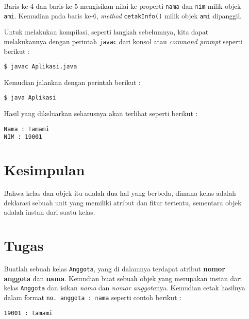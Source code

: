 Baris ke-4 dan baris ke-5 mengisikan nilai ke properti \texttt{nama} dan \texttt{nim} milik objek \texttt{ami}. Kemudian pada baris ke-6, \textit{method} \texttt{cetakInfo()} milik objek \texttt{ami} dipanggil.

Untuk melakukan kompilasi, seperti langkah sebelumnya, kita dapat melakukannya dengan perintah \texttt{javac} dari konsol atau \textit{command prompt} seperti berikut :

\begin{lstlisting}
$ javac Aplikasi.java
\end{lstlisting}

Kemudian jalankan dengan perintah berikut :

\begin{lstlisting}
$ java Aplikasi
\end{lstlisting}

Hasil yang dikeluarkan seharusnya akan terlihat seperti berikut :

\begin{lstlisting}
Nama : Tamami
NIM : 19001
\end{lstlisting}

\section{Kesimpulan}

Bahwa kelas dan objek itu adalah dua hal yang berbeda, dimana kelas adalah deklarasi sebuah unit yang memiliki atribut dan fitur tertentu, sementara objek adalah instan dari suatu kelas.

\section{Tugas}

Buatlah sebuah kelas \texttt{Anggota}, yang di dalamnya terdapat atribut \textbf{nomor anggota} dan \textbf{nama}. Kemudian buat sebuah objek yang merupakan instan dari kelas \texttt{Anggota} dan isikan \textit{nama} dan \textit{nomor anggota}nya. Kemudian cetak hasilnya dalam format \texttt{no. anggota : nama} seperti contoh berikut :

\begin{lstlisting}
19001 : tamami
\end{lstlisting}